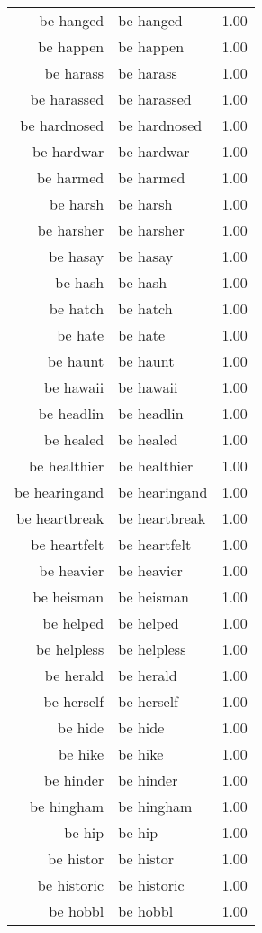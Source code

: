 \begin{table}[ht]
\begin{tabular}{rlr}
  be hanged & be hanged & 1.00 \\ 
  be happen & be happen & 1.00 \\ 
  be harass & be harass & 1.00 \\ 
  be harassed & be harassed & 1.00 \\ 
  be hardnosed & be hardnosed & 1.00 \\ 
  be hardwar & be hardwar & 1.00 \\ 
  be harmed & be harmed & 1.00 \\ 
  be harsh & be harsh & 1.00 \\ 
  be harsher & be harsher & 1.00 \\ 
  be hasay & be hasay & 1.00 \\ 
  be hash & be hash & 1.00 \\ 
  be hatch & be hatch & 1.00 \\ 
  be hate & be hate & 1.00 \\ 
  be haunt & be haunt & 1.00 \\ 
  be hawaii & be hawaii & 1.00 \\ 
  be headlin & be headlin & 1.00 \\ 
  be healed & be healed & 1.00 \\ 
  be healthier & be healthier & 1.00 \\ 
  be hearingand & be hearingand & 1.00 \\ 
  be heartbreak & be heartbreak & 1.00 \\ 
  be heartfelt & be heartfelt & 1.00 \\ 
  be heavier & be heavier & 1.00 \\ 
  be heisman & be heisman & 1.00 \\ 
  be helped & be helped & 1.00 \\ 
  be helpless & be helpless & 1.00 \\ 
  be herald & be herald & 1.00 \\ 
  be herself & be herself & 1.00 \\ 
  be hide & be hide & 1.00 \\ 
  be hike & be hike & 1.00 \\ 
  be hinder & be hinder & 1.00 \\ 
  be hingham & be hingham & 1.00 \\ 
  be hip & be hip & 1.00 \\ 
  be histor & be histor & 1.00 \\ 
  be historic & be historic & 1.00 \\ 
  be hobbl & be hobbl & 1.00 \\ 

\end{tabular}
\end{table}
